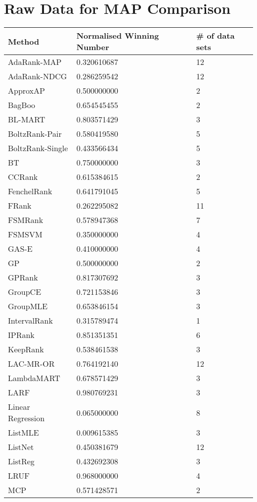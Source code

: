 \chapter{Raw Data for MAP Comparison}
\label{app:norm_winnum_map}

\begin{longtable}{l|l|l}
Method & Normalised Winning Number & \# of data sets \\
\hline
AdaRank-\acs{MAP} & 0.320610687 & 12 \\ 
AdaRank-\acs{NDCG} & 0.286259542 & 12 \\ 
Approx\acs{AP} & 0.500000000 & 2 \\ 
BagBoo & 0.654545455 & 2 \\ 
BL-MART & 0.803571429 & 3 \\ 
BoltzRank-Pair & 0.580419580 & 5 \\ 
BoltzRank-Single & 0.433566434 & 5 \\ 
BT & 0.750000000 & 3 \\ 
CCRank & 0.615384615 & 2 \\ 
FenchelRank & 0.641791045 & 5 \\ 
FRank & 0.262295082 & 11 \\ 
FSMRank & 0.578947368 & 7 \\ 
FSM\acs{SVM} & 0.350000000 & 4 \\ 
GAS-E & 0.410000000 & 4 \\ 
\acs{GP} & 0.500000000 & 2 \\ 
\acs{GP}Rank & 0.817307692 & 3 \\ 
GroupCE & 0.721153846 & 3 \\ 
Group\acs{MLE} & 0.653846154 & 3 \\ 
IntervalRank & 0.315789474 & 1 \\ 
\acs{IP}Rank & 0.851351351 & 6 \\ 
KeepRank & 0.538461538 & 3 \\ 
LAC-MR-OR & 0.764192140 & 12 \\ 
LambdaMART & 0.678571429 & 3 \\ 
LARF & 0.980769231 & 3 \\ 
Linear Regression & 0.065000000 & 8 \\ 
List\acs{MLE} & 0.009615385 & 3 \\ 
ListNet & 0.450381679 & 12 \\ 
ListReg & 0.432692308 & 3 \\ 
LRUF & 0.968000000 & 4 \\ 
MCP & 0.571428571 & 2 \\ 

\end{longtable}
